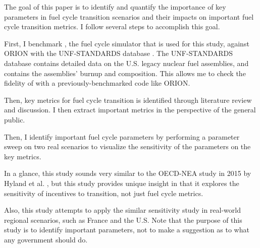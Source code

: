 
The goal of this paper is to identify and quantify the
importance of key parameters in fuel cycle transition scenarios
and their impacts on important fuel cycle transition metrics.
I follow several steps to accomplish this goal.

First, I benchmark \Cyclus, the fuel cycle simulator that is used for this study,
against \gls{ORION} \cite{gregg_analysis_2012} with the \gls{UNF-STANDARDS} database
\cite{peterson_used_2013}. The \gls{UNF-STANDARDS} database contains detailed
data on the U.S. legacy nuclear fuel assemblies, and contains the
assemblies' burnup and composition. This allows me to check the fidelity of \Cyclus with a previously-benchmarked code like \gls{ORION}.

Then, key metrics for fuel cycle transition
is identified through literature review and discussion. I then
extract important metrics in the perspective of the general public.

Then, I identify important fuel cycle parameters by performing a parameter
sweep on two real scenarios to visualize the sensitivity of the parameters
on the key metrics.

In a glance, this study sounds very similar to the OECD-NEA study in 2015
by Hyland et al. \cite{hyland_effects_2015}, but this study provides
unique insight in that it explores the sensitivity of incentives to
transition, not just fuel cycle metrics.

Also, this study attempts to apply the similar sensitivity study in
real-world regional scenarios, such as France and the U.S. Note that the purpose
of this study is to identify important parameters, not to make a suggestion
as to what any government should do.
